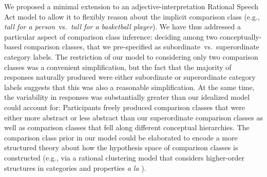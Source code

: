 \documentclass[doc, floatsintext]{apa6}
\begin{document}
We proposed a minimal extension to an adjective-interpretation Rational Speech Act model to allow it to flexibly reason about the implicit comparison class (e.g., \emph{tall for a person}~vs.~\emph{tall for a basketball player}).
We have thus addressed a particular aspect of comparison class inference: deciding among two conceptually-based comparison classes, that we pre-specified as subordinate~vs.~superordinate category labels.
The restriction of our model to considering only two comparison classes was a convenient simplification, but the fact that the majority of responses naturally produced were either subordinate or superordinate category labels suggests that this was also a reasonable simplification. 
At the same time, the variability in responses was substantially greater than our idealized model could account for: Participants freely produced comparison classes that were either more abstract or less abstract than our superordinate comparison classes as well as comparison classes that fell along different conceptual hierarchies. 
The comparison class prior in our model could be elaborated to encode a more structured theory about how the hypothesis space of comparison classes is constructed (e.g., via a rational clustering model that considers higher-order structures in categories and properties \emph{a la} ).


\end{document}

